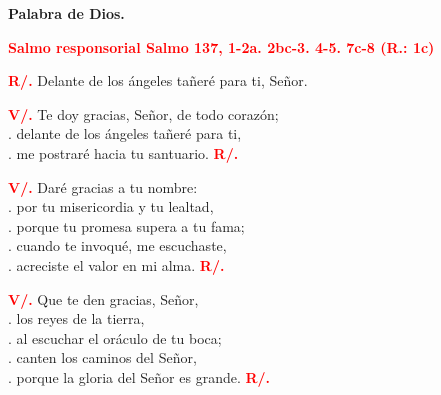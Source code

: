 \documentclass[12pt, letterpaper]{article}
\begin{document}
    {\bfseries Palabra de Dios.}

    \Large {\bfseries \textcolor{red}{Salmo responsorial \hspace{1cm} Salmo 137, 1-2a. 2bc-3. 4-5. 7c-8 (R.: 1c)}}

    \Large {\bfseries \textcolor{red}{R/.}} \hspace{1cm} Delante de los \'angeles ta\~ner\'e para ti, Se\~nor.

    {\bfseries \textcolor{red}{V/.}} \hspace{1cm} Te doy gracias, Se\~nor, de todo coraz\'on;\\
    . \hspace{2.5cm} delante de los \'angeles ta\~ner\'e para ti,\\
    . \hspace{2.5cm} me postrar\'e hacia tu santuario.
    \hspace{1cm} {\bfseries \textcolor{red}{R/.}}

    {\bfseries \textcolor{red}{V/.}} \hspace{1cm} Dar\'e gracias a tu nombre:\\
    . \hspace{2.5cm} por tu misericordia y tu lealtad,\\
    . \hspace{2.5cm} porque tu promesa supera a tu fama;\\
    . \hspace{2.5cm} cuando te invoqu\'e, me escuchaste,\\
    . \hspace{2.5cm} acreciste el valor en mi alma.
    \hspace{1cm} {\bfseries \textcolor{red}{R/.}}

    {\bfseries \textcolor{red}{V/.}} \hspace{1cm} Que te den gracias, Se\~nor,\\
    . \hspace{2.5cm} los reyes de la tierra,\\
    . \hspace{2.5cm} al escuchar el or\'aculo de tu boca;\\
    . \hspace{2.5cm} canten los caminos del Se\~nor,\\
    . \hspace{2.5cm} porque la gloria del Se\~nor es grande.
    \hspace{1cm} {\bfseries \textcolor{red}{R/.}}
\end{document}
